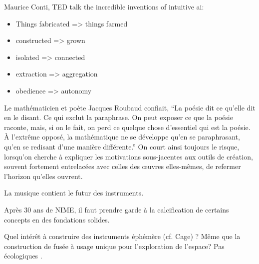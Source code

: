 Maurice Conti, TED talk the incredible inventions of intuitive ai:
\vspace{-1em}
\begin{itemize}[noitemsep]
	\item Things fabricated => things farmed
	\item constructed => grown
	\item isolated => connected
	\item extraction => aggregation
	\item obedience => autonomy
\end{itemize}


Le mathématicien et poète Jacques Roubaud confiait, ``La poésie dit ce qu’elle dit en le disant. Ce qui exclut la paraphrase. On peut exposer ce que la poésie raconte, mais, si on le fait, on perd ce quelque chose d’essentiel qui est la poésie. À l’extrême opposé, la mathématique ne se développe qu’en se paraphrasant, qu’en se redisant d’une manière différente.''
On court ainsi toujours le risque, lorsqu'on cherche à expliquer les motivations sous-jacentes aux outils de création, souvent fortement entrelacées avec celles des œuvres elles-mêmes, de refermer l'horizon qu'elles ouvrent.

La musique contient le futur des instruments.


Après 30 ans de NIME, il faut prendre garde à la calcification de certains concepts en des fondations solides. 

Quel intérêt à construire des instruments éphémère (cf. Cage) ?
Même que la construction de fusée à usage unique pour l'exploration de l'espace?
Pas écologiques .